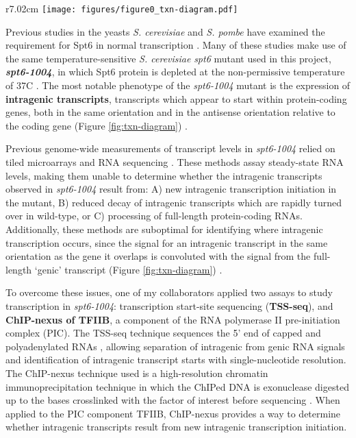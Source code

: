 \documentclass[9pt, letterpaper]{article}
\begin{document}
\begin{wrapfigure}[9]{r}{7.02cm}
\centering
\texttt{[image: figures/figure0\_txn-diagram.pdf]}
\caption{Diagram of transcript orientation with respect to coding DNA sequences, for the categories of transcripts referred to in this document.}
\label{fig:txn-diagram}
\end{wrapfigure}

Previous studies in the yeasts \textit{S. cerevisiae} and \textit{S. pombe} have examined the requirement for Spt6 in normal transcription \cite{cheung2008, degennaro2013, kaplan2003, pathak2018, uwimana2017, vanbakel2013}. Many of these studies make use of the same temperature-sensitive \textit{S. cerevisiae} \textit{spt6} mutant used in this project, \textbf{\textit{spt6-1004}}, in which Spt6 protein is depleted at the non-permissive temperature of 37\textdegree C \cite{kaplan2003}. The most notable phenotype of the \textit{spt6-1004} mutant is the expression of \textbf{intragenic transcripts}, transcripts which appear to start within protein-coding genes, both in the same orientation and in the antisense orientation relative to the coding gene (Figure \ref{fig:txn-diagram}) \cite{cheung2008, degennaro2013, kaplan2003, uwimana2017}.

Previous genome-wide measurements of transcript levels in \textit{spt6-1004} relied on tiled microarrays \cite{cheung2008} and RNA sequencing \cite{uwimana2017}. These methods assay steady-state RNA levels, making them unable to determine whether the intragenic transcripts observed in \textit{spt6-1004} result from: A) new intragenic transcription initiation in the mutant, B) reduced decay of intragenic transcripts which are rapidly turned over in wild-type, or C) processing of full-length protein-coding RNAs. Additionally, these methods are suboptimal for identifying where intragenic transcription occurs, since the signal for an intragenic transcript in the same orientation as the gene it overlaps is convoluted with the signal from the full-length `genic' transcript (Figure \ref{fig:txn-diagram}) \cite{cheung2008, lickwar2009}.

To overcome these issues, one of my collaborators applied two assays to study transcription in \textit{spt6-1004}: transcription start-site sequencing (\textbf{TSS-seq}), and \textbf{ChIP-nexus of TFIIB}, a component of the RNA polymerase II pre-initiation complex (PIC). The TSS-seq technique sequences the 5' end of capped and polyadenylated RNAs \cite{arribere2013, malabat2015}, allowing separation of intragenic from genic RNA signals and identification of intragenic transcript starts with single-nucleotide resolution. The ChIP-nexus technique used is a high-resolution chromatin immunoprecipitation technique in which the ChIPed DNA is exonuclease digested up to the bases crosslinked with the factor of interest before sequencing \cite{he2015}. When applied to the PIC component TFIIB, ChIP-nexus provides a way to determine whether intragenic transcripts result from new intragenic transcription initiation.
\end{document}
